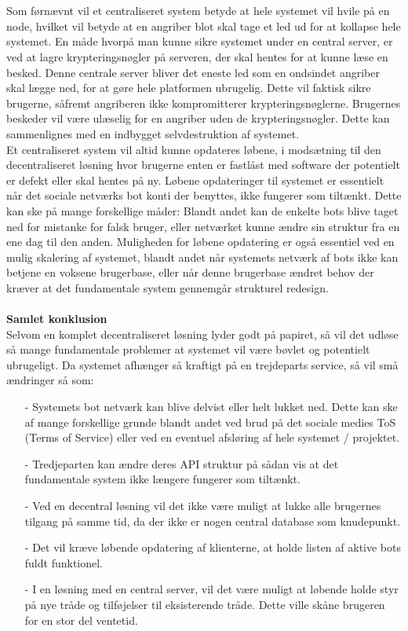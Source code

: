 \\\\
Som førnævnt vil et centraliseret system betyde at hele systemet vil hvile på en node, hvilket vil betyde at en angriber blot skal tage et led ud for at kollapse hele systemet. En måde hvorpå man kunne sikre systemet under en central server, er ved at lagre krypteringsnøgler på serveren, der skal hentes for at kunne læse en besked. Denne centrale server bliver det eneste led som en ondsindet angriber skal lægge ned, for at gøre hele platformen ubrugelig. Dette vil faktisk sikre brugerne, såfremt angriberen ikke kompromitterer krypteringsnøglerne. Brugernes beskeder vil være ulæselig for en angriber uden de krypteringsnøgler. Dette kan sammenlignes med en indbygget selvdestruktion af systemet.\\
Et centraliseret system vil altid kunne opdateres løbene, i modsætning til den decentraliseret løsning hvor brugerne enten er fastlåst med software der potentielt er defekt eller skal hentes på ny. Løbene opdateringer til systemet er essentielt når det sociale netværks bot konti der benyttes, ikke fungerer som tiltænkt. Dette kan ske på mange forskellige måder: Blandt andet kan de enkelte bots blive taget ned for mistanke for falsk bruger, eller netværket kunne ændre sin struktur fra en ene dag til den anden. Muligheden for løbene opdatering er også essentiel ved en mulig skalering af systemet, blandt andet når systemets netværk af bots ikke kan betjene en voksene brugerbase, eller når denne brugerbase ændret behov der kræver at det fundamentale system gennemgår strukturel redesign.
\\\\
\textbf{Samlet konklusion}\\
Selvom en komplet decentraliseret løsning lyder godt på papiret, så vil det udløse så mange fundamentale problemer at systemet vil være bøvlet og potentielt ubrugeligt. Da systemet afhænger så kraftigt på en trejdeparts service, så vil små ændringer så som:
\begin{itemize}
    \item[-] Systemets bot netværk kan blive delvist eller helt lukket ned. Dette kan ske af mange forskellige grunde blandt andet ved brud på det sociale medies ToS (Terms of Service) eller ved en eventuel afsløring af hele systemet / projektet. 
    \item[-] Tredjeparten kan ændre deres API struktur på sådan vis at det fundamentale system ikke længere fungerer som tiltænkt.
    \item[-] Ved en decentral løsning vil det ikke være muligt at lukke alle brugernes tilgang på samme tid, da der ikke er nogen central database som knudepunkt.
    \item[-] Det vil kræve løbende opdatering af klienterne, at holde listen af aktive bots fuldt funktionel.
    \item[-] I en løsning med en central server, vil det være muligt at løbende holde styr på nye tråde og tilføjelser til eksisterende tråde. Dette ville skåne brugeren for en stor del ventetid.  
\end{itemize}

